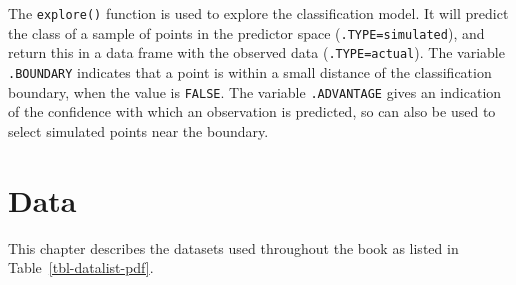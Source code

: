 \documentclass[
  letterpaper,
]{krantz}
\begin{document}
The \texttt{explore()} function is used to explore the classification
model. It will predict the class of a sample of points in the predictor
space (\texttt{.TYPE=simulated}), and return this in a data frame with
the observed data (\texttt{.TYPE=actual}). The variable
\texttt{.BOUNDARY} indicates that a point is within a small distance of
the classification boundary, when the value is \texttt{FALSE}. The
variable \texttt{.ADVANTAGE} gives an indication of the confidence with
which an observation is predicted, so can also be used to select
simulated points near the boundary.

\chapter{Data}\label{data}

This chapter describes the datasets used throughout the book as listed
in Table~\ref{tbl-datalist-pdf}.
\end{document}
